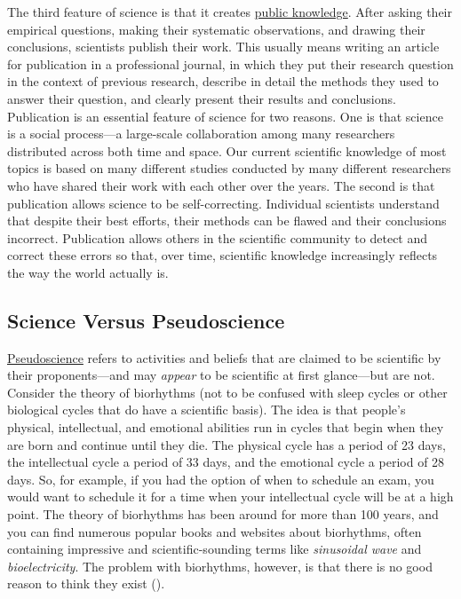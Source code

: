 \documentclass[
]{krantz}
\begin{document}
The third feature of science is that it creates \hyperref[public-knowledge]{public knowledge}. After asking their empirical questions, making their systematic observations, and drawing their conclusions, scientists publish their work. This usually means writing an article for publication in a professional journal, in which they put their research question in the context of previous research, describe in detail the methods they used to answer their question, and clearly present their results and conclusions. Publication is an essential feature of science for two reasons. One is that science is a social process---a large-scale collaboration among many researchers distributed across both time and space. Our current scientific knowledge of most topics is based on many different studies conducted by many different researchers who have shared their work with each other over the years. The second is that publication allows science to be self-correcting. Individual scientists understand that despite their best efforts, their methods can be flawed and their conclusions incorrect. Publication allows others in the scientific community to detect and correct these errors so that, over time, scientific knowledge increasingly reflects the way the world actually is.

\subsection*{Science Versus Pseudoscience}\label{science-versus-pseudoscience}


\hyperref[pseudoscience]{Pseudoscience} refers to activities and beliefs that are claimed to be scientific by their proponents---and may \emph{appear} to be scientific at first glance---but are not. Consider the theory of biorhythms (not to be confused with sleep cycles or other biological cycles that do have a scientific basis). The idea is that people's physical, intellectual, and emotional abilities run in cycles that begin when they are born and continue until they die. The physical cycle has a period of 23 days, the intellectual cycle a period of 33 days, and the emotional cycle a period of 28 days. So, for example, if you had the option of when to schedule an exam, you would want to schedule it for a time when your intellectual cycle will be at a high point. The theory of biorhythms has been around for more than 100 years, and you can find numerous popular books and websites about biorhythms, often containing impressive and scientific-sounding terms like \emph{sinusoidal wave} and \emph{bioelectricity}. The problem with biorhythms, however, is that there is no good reason to think they exist ().
\end{document}
